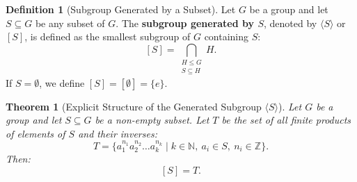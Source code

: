 \documentclass[12pt]{article}
\theoremstyle{definition}
\newtheorem{definition}{Definition}[section]
\theoremstyle{plain}
\newtheorem{theorem}{Theorem}[section]
\begin{document}
\begin{definition}[Subgroup Generated by a Subset]
Let $G$ be a group and let $S \subseteq G$ be any subset of $G$.
The \textbf{subgroup generated by $S$}, denoted by $\langle S \rangle$ or $[S]$, is defined as the smallest subgroup of $G$ containing $S$:
\[
[S] = \bigcap_{\substack{H \le G \\ S \subseteq H}} H.
\]
If $S = \emptyset$, we define $[S] = [ \emptyset ] = \{e\}$.
\end{definition}

\begin{theorem}[Explicit Structure of the Generated Subgroup $\langle S \rangle$]
Let $G$ be a group and let $S \subseteq G$ be a non-empty subset.
Let $T$ be the set of all finite products of elements of $S$ and their inverses:
\[
T = \{a_1^{n_1} a_2^{n_2} \dots a_k^{n_k} \mid k \in \mathbb{N},\ a_i \in S,\ n_i \in \mathbb{Z}\}.
\]
Then:
\[
\boxed{[S] = T}.
\]
\end{theorem}
\end{document}
